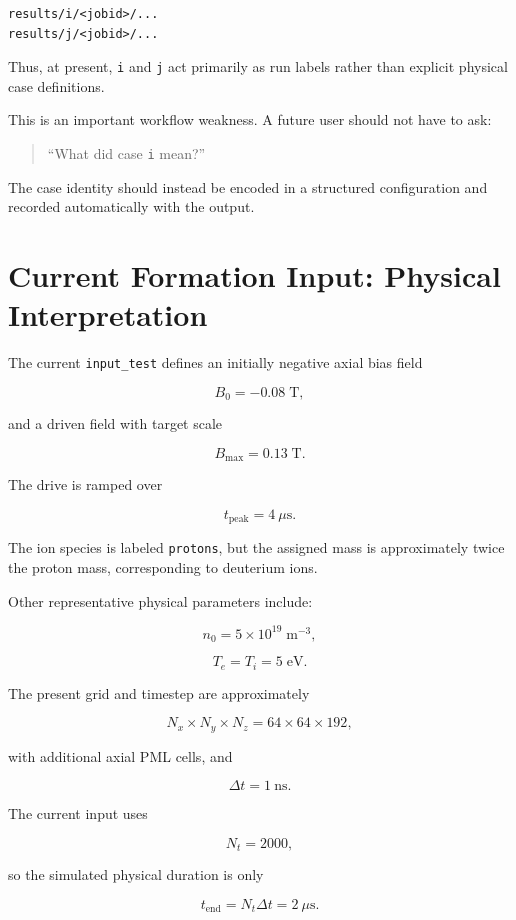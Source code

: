 \documentclass[11pt,a4paper]{article}
\begin{document}
\begin{lstlisting}
results/i/<jobid>/...
results/j/<jobid>/...
\end{lstlisting}

Thus, at present, \texttt{i} and \texttt{j} act primarily as run labels rather than explicit physical case definitions.

This is an important workflow weakness. A future user should not have to ask:

\begin{quote}
``What did case \texttt{i} mean?''
\end{quote}

The case identity should instead be encoded in a structured configuration and recorded automatically with the output.

\section{Current Formation Input: Physical Interpretation}

The current \texttt{input\_test} defines an initially negative axial bias field

\[
B_0 = -0.08\;\mathrm{T},
\]

and a driven field with target scale

\[
B_{\max}=0.13\;\mathrm{T}.
\]

The drive is ramped over

\[
t_{\mathrm{peak}} = 4~\mu\mathrm{s}.
\]

The ion species is labeled \texttt{protons}, but the assigned mass is approximately twice the proton mass, corresponding to deuterium ions.

Other representative physical parameters include:

\[
n_0 = 5\times 10^{19}\;\mathrm{m}^{-3},
\]

\[
T_e = T_i = 5\;\mathrm{eV}.
\]

The present grid and timestep are approximately

\[
N_x\times N_y\times N_z = 64\times64\times192,
\]

with additional axial PML cells, and

\[
\Delta t = 1~\mathrm{ns}.
\]

The current input uses

\[
N_t=2000,
\]

so the simulated physical duration is only

\[
t_{\mathrm{end}} = N_t\Delta t = 2~\mu\mathrm{s}.
\]
\end{document}

